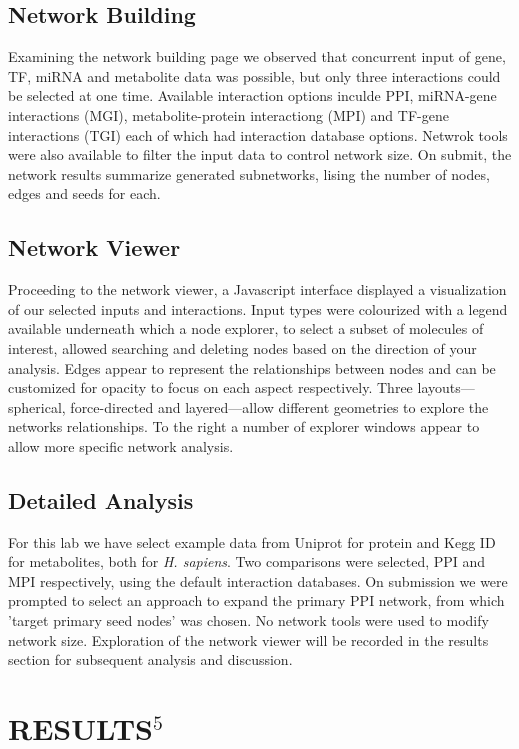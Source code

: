 \documentclass[letterpaper, 10 pt, conference]{ieeeconf}  %
\begin{document}
\subsection{Network Building}

Examining the network building page we observed that concurrent input of gene, TF, miRNA and metabolite data was possible, but only three interactions could be selected at one time. Available interaction options inculde PPI, miRNA-gene interactions (MGI), metabolite-protein interactiong (MPI) and TF-gene interactions (TGI) each of which had interaction database options. Netwrok tools were also available to filter the input data to control network size. On submit, the network results summarize generated subnetworks, lising the number of nodes, edges and seeds for each.

\subsection{Network Viewer}

Proceeding to the network viewer, a Javascript interface displayed a visualization of our selected inputs and interactions. Input types were colourized with a legend available underneath which a node explorer, to select a subset of molecules of interest, allowed searching and deleting nodes based on the direction of your analysis. Edges appear to represent the relationships between nodes and can be customized for opacity to focus on each aspect respectively. Three layouts---spherical, force-directed and layered---allow different geometries to explore the networks relationships. To the right a number of explorer windows appear to allow more specific network analysis.

\subsection{Detailed Analysis}

For this lab we have select example data from Uniprot for protein and Kegg ID for metabolites, both for \emph{H. sapiens}. Two comparisons were selected, PPI and MPI respectively, using the default interaction databases. On submission we were prompted to select an approach to expand the primary PPI network, from which 'target primary seed nodes' was chosen. No network tools were used to modify network size. Exploration of the network viewer will be recorded in the results section for subsequent analysis and discussion.

\section{RESULTS$^5$}
\end{document}
